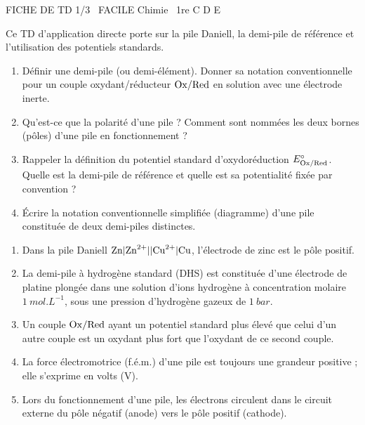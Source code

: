 \documentclass[11pt]{article}
\begin{document}
\begin{tcolorbox}[enhanced,colback=popink,colframe=popink,arc=10pt,boxrule=0pt,left=12pt,right=12pt,top=9pt,bottom=9pt]
{\color{white}\popxbold\small FICHE DE TD 1/3 \textbullet\ FACILE \hfill Chimie \textbullet\ 1re C D E\par}
\end{tcolorbox}
\vspace{4pt}
\noindent Ce TD d'application directe porte sur la pile Daniell, la demi-pile de référence et l'utilisation des potentiels standards.

\begin{exercice}
\begin{enumerate}
    \item Définir une demi-pile (ou demi-élément). Donner sa notation conventionnelle pour un couple oxydant/réducteur $\ce{Ox/Red}$ en solution avec une électrode inerte.
    \item Qu'est-ce que la polarité d'une pile ? Comment sont nommées les deux bornes (pôles) d'une pile en fonctionnement ?
    \item Rappeler la définition du potentiel standard d'oxydoréduction $E^\circ_{\ce{Ox/Red}}$. Quelle est la demi-pile de référence et quelle est sa potentialité fixée par convention ?
    \item Écrire la notation conventionnelle simplifiée (diagramme) d'une pile constituée de deux demi-piles distinctes.
\end{enumerate}
\end{exercice}

\begin{exercice}
\begin{enumerate}
    \item Dans la pile Daniell $\ce{Zn}|\ce{Zn^{2+}}||\ce{Cu^{2+}}|\ce{Cu}$, l'électrode de zinc est le pôle positif.
    \item La demi-pile à hydrogène standard (DHS) est constituée d'une électrode de platine plongée dans une solution d'ions hydrogène à concentration molaire $\SI{1}{mol.L^{-1}}$, sous une pression d'hydrogène gazeux de $\SI{1}{bar}$.
    \item Un couple $\ce{Ox/Red}$ ayant un potentiel standard plus élevé que celui d'un autre couple est un oxydant plus fort que l'oxydant de ce second couple.
    \item La force électromotrice (f.é.m.) d'une pile est toujours une grandeur positive ; elle s'exprime en volts (V).
    \item Lors du fonctionnement d'une pile, les électrons circulent dans le circuit externe du pôle négatif (anode) vers le pôle positif (cathode).
\end{enumerate}
\end{exercice}
\end{document}
